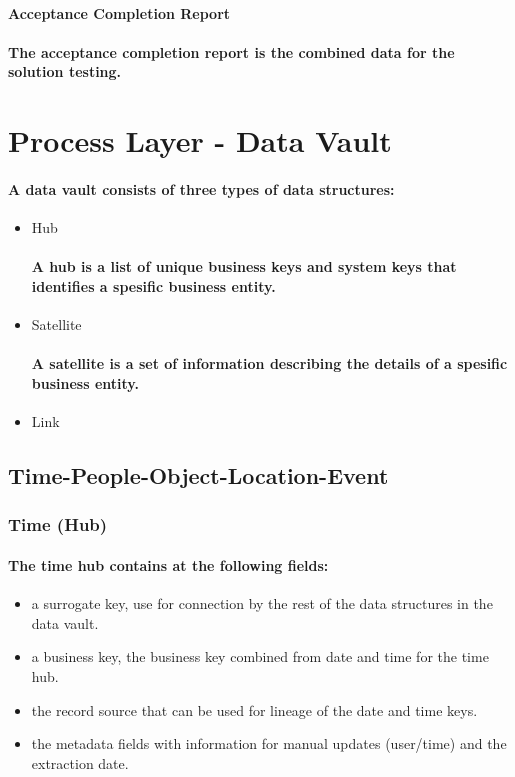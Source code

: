 \documentclass{acm_proc_article-sp}
\begin{document}
\paragraph{Acceptance Completion Report}
\paragraph{The acceptance completion report is the combined data for the solution testing.}
\pagebreak
\section{Process Layer - Data Vault}
\paragraph{A data vault consists of three types of data structures:}
\begin{itemize}
\item{Hub}
\paragraph{A hub is a list of unique business keys and system keys that identifies a spesific business entity.}
\item{Satellite}
\paragraph{A satellite is a set of information describing the details of a spesific business entity.}
\item{Link}
\end{itemize}
\subsection{Time-People-Object-Location-Event}
\subsubsection{Time (Hub)}
\paragraph{The time hub contains at the following fields:}
\begin{itemize}
  \item{a surrogate key, use for connection by the rest of the data structures in the data vault.}
  \item{a business key, the business key combined from date and time for the time hub.}
  \item{the record source that can be used for lineage of the date and time keys.}
  \item{the metadata fields with information for manual updates (user/time) and the extraction date.}
\end{itemize}
\end{document}

